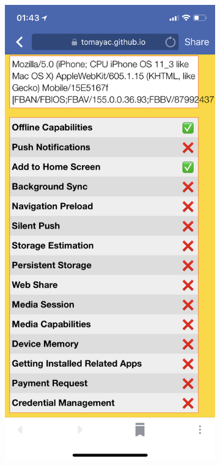 \documentclass[sigconf]{acmart}
\begin{document}
\begin{figure}[t]
  \centering
  \begin{subfigure}[t]{0.475\columnwidth}
    \includegraphics[width=1\columnwidth,frame]{pwa-feature-detector-facebook-ios-safari11_1}

\end{subfigure}
\end{figure}
\end{document}
